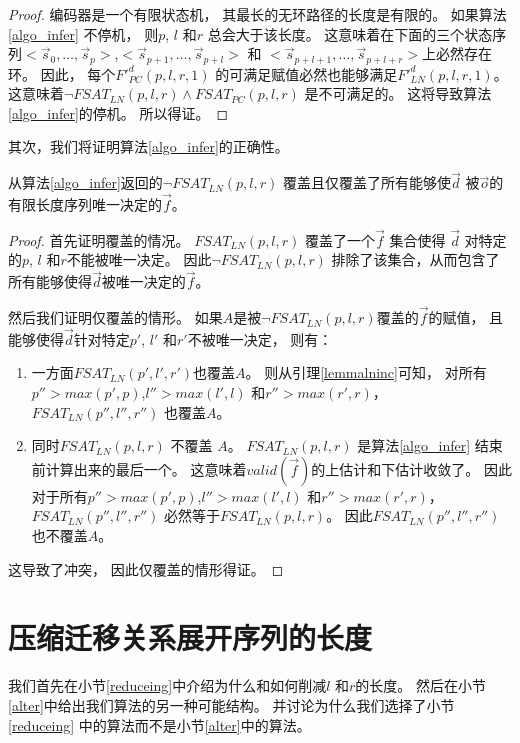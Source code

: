\begin{proof}
编码器是一个有限状态机，
其最长的无环路径的长度是有限的。
如果算法\ref{algo_infer} 不停机，
则$p$, $l$ 和$r$ 总会大于该长度。
这意味着在下面的三个状态序列$<\vec{s}_{0},\dots,\vec{s}_{p}>$,$<\vec{s}_{p+1},\dots,\vec{s}_{p+l}>$ 和
$<\vec{s}_{p+l+1},\dots,\vec{s}_{p+l+r}>$上必然存在环。
因此，
每个$F'^d_{PC}(p,l,r,1)$ 的可满足赋值必然也能够满足$F'^d_{LN}(p,l,r,1)$。
这意味着$\neg FSAT_{LN}(p,l,r)\wedge FSAT_{PC}(p,l,r)$ 是不可满足的。
这将导致算法\ref{algo_infer}的停机。
所以得证。
\end{proof}


其次，我们将证明算法\ref{algo_infer}的正确性。

\begin{theorem}
从算法\ref{algo_infer}返回的$\neg FSAT_{LN}(p,l,r)$  覆盖且仅覆盖了所有能够使$\vec{d}$
被$\vec{o}$的有限长度序列唯一决定的$\vec{f}$。
\end{theorem}
\begin{proof}
首先证明覆盖的情况。
$FSAT_{LN}(p,l,r)$ 覆盖了一个$\vec{f}$ 集合使得
$\vec{d}$ 对特定的$p$, $l$ 和$r$不能被唯一决定。
因此$\neg FSAT_{LN}(p,l,r)$ 排除了该集合，从而包含了所有能够使得$\vec{d}$被唯一决定的$\vec{f}$。

然后我们证明仅覆盖的情形。
如果$A$是被$\neg FSAT_{LN}(p,l,r)$覆盖的$\vec{f}$的赋值，
且能够使得$\vec{d}$针对特定$p'$, $l'$ 和$r'$不被唯一决定，
则有：

\begin{enumerate}
 \item 一方面$FSAT_{LN}(p',l',r')$也覆盖$A$。
 则从引理\ref{lemmalninc}可知，
 对所有$p''>max(p',p)$,$l''>max(l',l)$ 和$r''>max(r',r)$，
 $FSAT_{LN}(p'',l'',r'')$ 也覆盖$A$。

 \item 同时$FSAT_{LN}(p,l,r)$ 不覆盖 $A$。
 $FSAT_{LN}(p,l,r)$ 是算法\ref{algo_infer} 结束前计算出来的最后一个。
 这意味着$valid(\vec{f})$的上估计和下估计收敛了。
 因此对于所有$p''>max(p',p)$,$l''>max(l',l)$ 和$r''>max(r',r)$，
 $FSAT_{LN}(p'',l'',r'')$ 必然等于$FSAT_{LN}(p,l,r)$。
 因此$FSAT_{LN}(p'',l'',r'')$ 也不覆盖$A$。
\end{enumerate}

这导致了冲突，
因此仅覆盖的情形得证。
\end{proof}


\section{压缩迁移关系展开序列的长度}\label{sec_min}
我们首先在小节\ref{reduceing}中介绍为什么和如何削减$l$ 和$r$的长度。
然后在小节\ref{alter}中给出我们算法的另一种可能结构。
并讨论为什么我们选择了小节\ref{reduceing} 中的算法而不是小节\ref{alter}中的算法。

